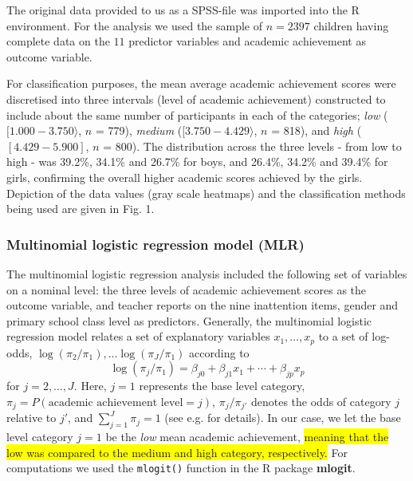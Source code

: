 \documentclass[10pt,letterpaper]{article}
\begin{document}
The original data provided to us as a SPSS-file was imported into the R environment. For the analysis we used the sample of $n=2397$ children having complete data 
on the $11$ predictor variables and academic achievement as outcome variable.


 For classification purposes, the mean average academic achievement scores were discretised into three intervals (level of academic achievement) constructed to include about the same number of participants in each of the categories;  
{ \it low} ($[1.000 - 3.750\rangle$,  $n$ = 779),
{\it medium} ($[3.750 - 4.429\rangle$, $n$ = 818), and
{\it high} ($[4.429 - 5.900]$, $n$ = 800). 
The distribution across the three levels - from low to high - was 39.2\%, 34.1\% and 26.7\% for boys, and 26.4\%, 34.2\% and 39.4\% for girls, confirming the overall higher academic scores achieved by the girls. 
 Depiction of the data values (gray scale heatmaps) and the classification methods being used are given in Fig. 1. 
 


\subsubsection*{Multinomial logistic regression model (MLR)}
The multinomial logistic regression analysis included the following set of variables on a nominal level: the three levels of academic achievement scores as the outcome variable, and teacher reports on the nine inattention items, gender and primary school class level as predictors. 
Generally, the multinomial logistic regression model relates a set of explanatory variables $x_1, \ldots, x_p$ to a set of log-odds, $\log(\pi_2/\pi_1), \ldots \log(\pi_J/\pi_1)$ according to
\begin{equation}
\label{eq_MLR}
\log(\pi_j/\pi_1) = \beta_{j0} + \beta_{j1} x_1 + \cdots + \beta_{jp} x_p
\end{equation}
for $j=2,\ldots,J$. Here, $j = 1$ represents the base level category, $\pi_j = P(\mbox{academic achievement level} = j)$, $\pi_j/\pi_{j'}$ denotes the odds of category $j$ relative to $j'$, and $\sum_{j=1}^J \pi_j = 1$ (see e.g. \cite{Bilder2015} for details).
In our case, we let the base level category $j=1$ be the {\it low} mean academic achievement, \colorbox{yellow}{meaning that the low was compared to the medium and high category, respectively.}
For computations we used the {\tt mlogit()} function in the R package {\bf mlogit}. \\
%
\end{document}
